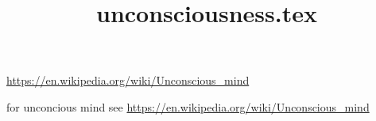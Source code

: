 \documentclass[a4paper]{article}
\title{unconsciousness.tex}
\date{}
\begin{document}
    \maketitle

    \url{https://en.wikipedia.org/wiki/Unconscious_mind}
    
    for unconcious mind see
    \url{https://en.wikipedia.org/wiki/Unconscious_mind}
\end{document}
